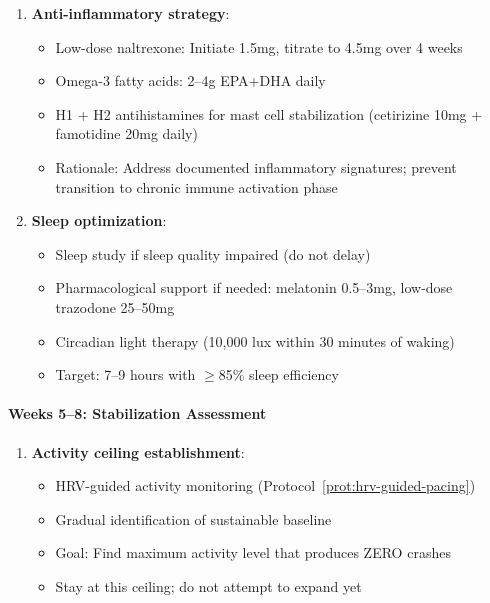 \begin{protocol}
\begin{enumerate}
    \item \textbf{Anti-inflammatory strategy}:
    \begin{itemize}
        \item Low-dose naltrexone: Initiate 1.5mg, titrate to 4.5mg over 4 weeks
        \item Omega-3 fatty acids: 2--4g EPA+DHA daily
        \item H1 + H2 antihistamines for mast cell stabilization (cetirizine 10mg + famotidine 20mg daily)
        \item Rationale: Address documented inflammatory signatures; prevent transition to chronic immune activation phase
    \end{itemize}

    \item \textbf{Sleep optimization}:
    \begin{itemize}
        \item Sleep study if sleep quality impaired (do not delay)
        \item Pharmacological support if needed: melatonin 0.5--3mg, low-dose trazodone 25--50mg
        \item Circadian light therapy (10,000 lux within 30 minutes of waking)
        \item Target: 7--9 hours with $\geq$85\% sleep efficiency
    \end{itemize}
\end{enumerate}

\paragraph{Weeks 5--8: Stabilization Assessment}

\begin{enumerate}
    \item \textbf{Activity ceiling establishment}:
    \begin{itemize}
        \item HRV-guided activity monitoring (Protocol~\ref{prot:hrv-guided-pacing})
        \item Gradual identification of sustainable baseline
        \item Goal: Find maximum activity level that produces ZERO crashes
        \item Stay at this ceiling; do not attempt to expand yet
    \end{itemize}


\end{enumerate}
\end{protocol}
